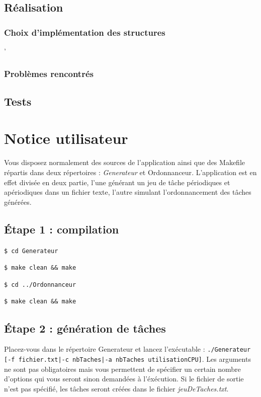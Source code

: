 	\section{Réalisation}
		\subsection{Choix d'implémentation des structures}
	'		
		\subsection{Problèmes rencontrés}


	\section{Tests}
	
\chapter{Notice utilisateur}

	Vous disposez normalement des sources de l'application ainsi que des Makefile répartis dans deux répertoires : \emph{Generateur} et {Ordonnanceur}. L'application est en effet divisée en deux partie, l'une générant un jeu de tâche périodiques et apériodiques dans un fichier texte, l'autre simulant l'ordonnancement des tâches générées.

	\section*{Étape 1 : compilation}
		\texttt{\$ cd Generateur}
		
		\texttt{\$ make clean && make}
		
		\texttt{\$ cd ../Ordonnanceur}
		
		\texttt{\$ make clean && make}
		
	\section*{Étape 2 : génération de tâches}
		
		Placez-vous dans le répertoire Generateur et lancez l'exécutable : \verb+./Generateur [-f fichier.txt|-c nbTaches|-a nbTaches utilisationCPU]+. Les arguments ne sont pas obligatoires mais vous permettent de spécifier un certain nombre d'options qui vous seront sinon demandées à l'éxécution. Si le fichier de sortie n'est pas spécifié, les tâches seront créées dans le fichier \emph{jeuDeTaches.txt}.\\
		
